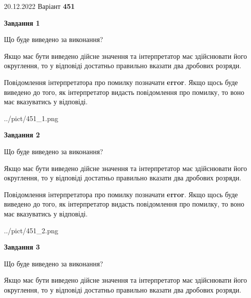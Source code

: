 \documentclass[12pt, ukrainian]{article}
\begin{document}
{20.12.2022 Варіант \No \textbf { 451 }\par}
{
\begin {Large}

{\begin {center}\textbf{Завдання 1}\end {center}}\par
Що буде виведено за виконання? \par

Якщо має бути виведено дійсне значення та інтерпретатор має здійснювати його округлення, 
то у відповіді достатньо правильно вказати два дробових розряди.

Повідомлення інтерпретатора про помилку позначати \textbf{error}.
Якщо щось буде виведено до того, як інтерпретатор видасть повідомлення про помилку, 
то воно має вказуватись у відповіді. \par

\begin{center}
	{../pict/451_1.png}
\end{center}
\newpage

{\begin {center}\textbf{Завдання 2}\end {center}}\par
Що буде виведено за виконання? \par

Якщо має бути виведено дійсне значення та інтерпретатор має здійснювати його округлення, 
то у відповіді достатньо правильно вказати два дробових розряди.

Повідомлення інтерпретатора про помилку позначати \textbf{error}.
Якщо щось буде виведено до того, як інтерпретатор видасть повідомлення про помилку, 
то воно має вказуватись у відповіді. \par

\begin{center}
	{../pict/451_2.png}
\end{center}
\newpage

{\begin {center}\textbf{Завдання 3}\end {center}}\par
Що буде виведено за виконання? \par

Якщо має бути виведено дійсне значення та інтерпретатор має здійснювати його округлення, 
то у відповіді достатньо правильно вказати два дробових розряди.


\end{Large}}
\end{document}
